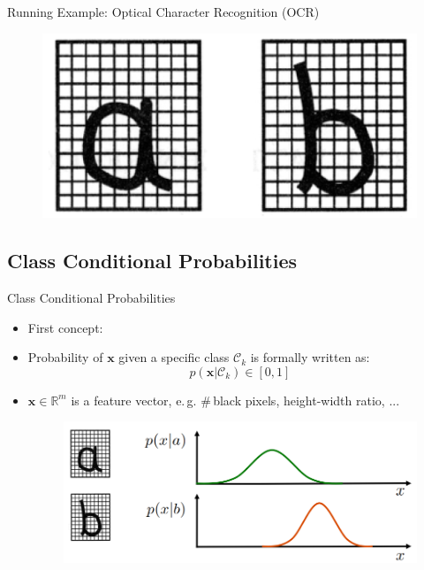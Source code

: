 \begin{frame}{Running Example: Optical Character Recognition (OCR)}{}
	\begin{figure}
		\centering
		\includegraphics[scale=0.6]{03_decision_theory/02_img/characters}
	\end{figure}
	\vspace*{-1mm}
	\footnotesize
\end{frame}


\subsection{Class Conditional Probabilities}

\begin{frame}{Class Conditional Probabilities}{}
	\begin{itemize}
		\item First concept: 
		\item Probability of $\bm{x}$ given a specific class $\mathcal{C}_k$ is formally written as:
		\begin{equation}
			p(\bm{x} \vert \mathcal{C}_k) \in [0, 1]
		\end{equation}
		\item $\bm{x} \in \mathbb{R}^m$ is a feature vector, e.\,g. \#\,black pixels, height-width ratio, ...
		\begin{figure}
			\centering
			\includegraphics[scale=0.3]{03_decision_theory/02_img/conditional_probabilities}
		\end{figure}
	\end{itemize}
\end{frame}


